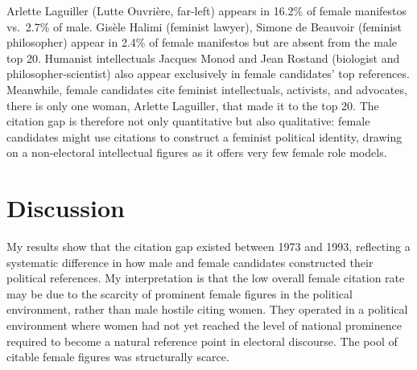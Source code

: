 \documentclass{article}
\begin{document}
\begin{table}[h]                                          
    \centering
    \small                                                  
    \label{tab:top20}
           
    \caption{Top 20 cited figures by candidate gender (percentage of manifestos   
  citing the figure). Figures marked $^*$ appear in one group's top 20 but not the
   other's.} 
\end{table}

Arlette Laguiller (Lutte Ouvrière, far-left) appears in 16.2\% of female manifestos vs.\ 2.7\% of male. Gisèle Halimi (feminist lawyer), Simone de Beauvoir (feminist philosopher) appear in 2.4\% of female manifestos but are absent from the male top 20. Humanist intellectuals Jacques Monod and Jean Rostand (biologist and philosopher-scientist) also appear exclusively in female candidates' top references. Meanwhile, female candidates cite feminist intellectuals, activists, and advocates, there is only one woman, Arlette Laguiller, that made it to the top 20. The citation gap is therefore not only quantitative but also qualitative: female candidates might use citations to construct a feminist political identity, drawing on a non-electoral intellectual figures as it offers very few female role models.




\section{Discussion}

My results show that the citation gap existed between 1973 and 1993, reflecting a systematic difference in how male and female candidates constructed their political references. My interpretation is that the low overall female citation rate may be due to the scarcity of prominent female figures in the political environment, rather than male hostile citing women. They operated in a political environment where women had not yet reached the level of national prominence required to become a natural reference point in electoral discourse. The pool of citable female figures was structurally scarce.
\end{document}
